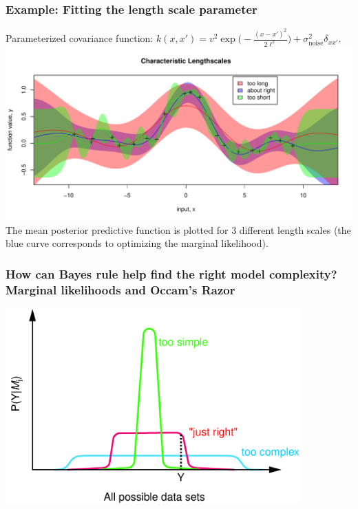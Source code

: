 \begin{frame}
\frametitle{Example: Fitting the length scale parameter}

Parameterized covariance function: $k(x,x') =
v^2\exp\big(-\displaystyle\frac{(x-x')^2}{2\ell^2}\big)
+\sigma_\mathrm{noise}^2\delta_{xx'}$.
\vskip-4mm
\includegraphics[width=\textwidth]{longshort2}
\vskip-4mm
The mean posterior predictive function is plotted for 3 different
length scales (the blue curve corresponds to optimizing the marginal
likelihood). 
\end{frame}


\begin{frame}
\frametitle{How can Bayes rule help find the right model complexity? 
  Marginal likelihoods and Occam's Razor}
\centerline{\includegraphics[width=0.85\textwidth]{ockham}}
\end{frame}


